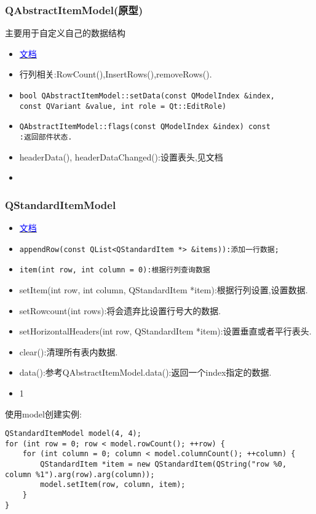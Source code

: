 \documentclass[11pt]{article}
\begin{document}
\subsubsection{QAbstractItemModel(原型)}
主要用于自定义自己的数据结构
\begin{itemize}
\item 
\href{https://doc.qt.io/qt-5/qabstractitemmodel.html}{
\textcolor{blue}{文档}}
\item 行列相关:RowCount(),InsertRows(),removeRows().
\item \begin{verbatim}
bool QAbstractItemModel::setData(const QModelIndex &index, 
const QVariant &value, int role = Qt::EditRole)
\end{verbatim}
\item \begin{verbatim}
QAbstractItemModel::flags(const QModelIndex &index) const
:返回部件状态.
\end{verbatim}
\item headerData(), headerDataChanged():设置表头,见文档
\item


\end{itemize}



\subsubsection{QStandardItemModel}
\begin{itemize}
\item 
\href{https://doc.qt.io/qt-6/qstandarditemmodel.html#details}{
\textcolor{blue}{文档}}
\item \verb|appendRow(const QList<QStandardItem *> &items)):添加一行数据;|
\item \verb|item(int row, int column = 0):根据行列查询数据|
\item setItem(int row, int column, QStandardItem *item):根据行列设置,设置数据.
\item setRowcount(int rows):将会遗弃比设置行号大的数据.
\item setHorizontalHeaders(int row, QStandardItem *item):设置垂直或者平行表头.
\item clear():清理所有表内数据.
\item data():参考QAbstractItemModel.data():返回一个index指定的数据.
\item 1



\end{itemize}
使用model创建实例:
\begin{lstlisting}
QStandardItemModel model(4, 4);
for (int row = 0; row < model.rowCount(); ++row) {
    for (int column = 0; column < model.columnCount(); ++column) {
        QStandardItem *item = new QStandardItem(QString("row %0, column %1").arg(row).arg(column));
        model.setItem(row, column, item);
    }
}
\end{lstlisting}
\end{document}
